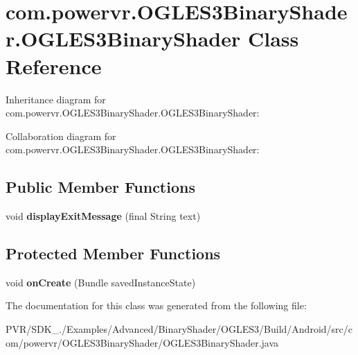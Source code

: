 \hypertarget{classcom_1_1powervr_1_1_o_g_l_e_s3_binary_shader_1_1_o_g_l_e_s3_binary_shader}{\section{com.\+powervr.\+O\+G\+L\+E\+S3\+Binary\+Shader.\+O\+G\+L\+E\+S3\+Binary\+Shader Class Reference}
\label{classcom_1_1powervr_1_1_o_g_l_e_s3_binary_shader_1_1_o_g_l_e_s3_binary_shader}
}


Inheritance diagram for com.\+powervr.\+O\+G\+L\+E\+S3\+Binary\+Shader.\+O\+G\+L\+E\+S3\+Binary\+Shader\+:


Collaboration diagram for com.\+powervr.\+O\+G\+L\+E\+S3\+Binary\+Shader.\+O\+G\+L\+E\+S3\+Binary\+Shader\+:
\subsection*{Public Member Functions}
\begin{DoxyCompactItemize}
\item 
\hypertarget{classcom_1_1powervr_1_1_o_g_l_e_s3_binary_shader_1_1_o_g_l_e_s3_binary_shader_a7ea336f9e258a0175c262589449d518c}{void {\bfseries display\+Exit\+Message} (final String text)}\label{classcom_1_1powervr_1_1_o_g_l_e_s3_binary_shader_1_1_o_g_l_e_s3_binary_shader_a7ea336f9e258a0175c262589449d518c}

\end{DoxyCompactItemize}
\subsection*{Protected Member Functions}
\begin{DoxyCompactItemize}
\item 
\hypertarget{classcom_1_1powervr_1_1_o_g_l_e_s3_binary_shader_1_1_o_g_l_e_s3_binary_shader_a509b790e71fc32af59aec4a83c065d10}{void {\bfseries on\+Create} (Bundle saved\+Instance\+State)}\label{classcom_1_1powervr_1_1_o_g_l_e_s3_binary_shader_1_1_o_g_l_e_s3_binary_shader_a509b790e71fc32af59aec4a83c065d10}

\end{DoxyCompactItemize}


The documentation for this class was generated from the following file\+:\begin{DoxyCompactItemize}
\item 
P\+V\+R/\+S\+D\+K\+\_./\+Examples/\+Advanced/\+Binary\+Shader/\+O\+G\+L\+E\+S3/\+Build/\+Android/src/com/powervr/\+O\+G\+L\+E\+S3\+Binary\+Shader/O\+G\+L\+E\+S3\+Binary\+Shader.\+java\end{DoxyCompactItemize}
